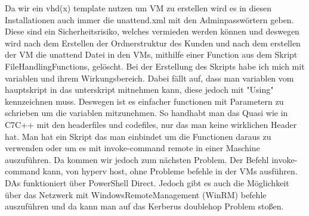 \documentclass[conference]{IEEEtran}
\begin{document}
Da wir ein vhd(x) template nutzen um VM zu erstellen wird es in diesen Installationen auch immer die unattend.xml mit den Adminpasswörtern geben. Diese sind ein Sicherheitsrisiko, welches vermieden werden können und deswegen wird nach dem Erstellen der Ordnerstruktur des Kunden und nach dem erstellen der VM die unattend Datei in den VMs, mithilfe einer Function aus dem Skript FileHandlingFunctions, gelöscht.
Bei der Erstellung des Skripts habe ich mich mit variablen und ihrem Wirkungsbereich. Dabei fällt auf, dass man variablen vom hauptskript in das unterskript mitnehmen kann, diese jedoch mit "Using" kennzeichnen muss. Deswegen ist es einfacher functionen mit Parametern zu schrieben um die variablen mitzunehmen. So handhabt man das Quasi wie in C7C++ mit den headerfiles und codefiles, nur das man keine wirklichen Header hat. Man hat ein Skript das man einbindet um die Functionen daraus zu verwenden oder um es mit invoke-command remote in einer Maschine auszuführen. Da kommen  wir jedoch zum nächsten Problem. Der Befehl invoke-command kann, von hyperv host, ohne Probleme befehle in der VMs ausführen. DAs funktioniert über PowerShell Direct. Jedoch gibt es auch die Möglichkeit über das Netzwerk mit WindowsRemoteManagement (WinRM) befehle auszuführen und da kann man auf das Kerberus doublehop Problem stoßen.
\end{document}
